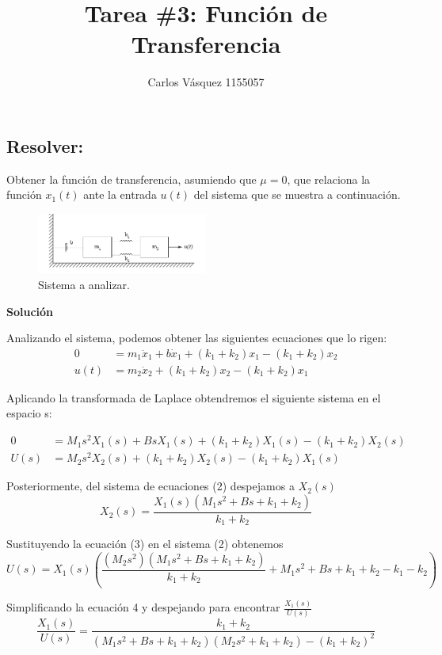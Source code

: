 \documentclass[12pt, letterpaper]{article}
\title{Tarea \#3: Función de Transferencia}
\author{Carlos Vásquez 1155057}
\begin{document}
\maketitle
\subsection*{Resolver:}
Obtener la función de transferencia, asumiendo que $\mu = 0$, que relaciona la función $x_1(t)$ ante la entrada $u(t)$ del sistema que se muestra a continuación.
\begin{figure}[H]
	\centering
	\includegraphics[width=0.5\textwidth]{sys.png}
	\caption{Sistema a analizar.}
\end{figure}
\textbf{Solución}

Analizando el sistema, podemos obtener las siguientes ecuaciones que lo rigen:
\begin{equation}
	\begin{split}
		0 &= m_1 \ddot x_1 + b\dot x_1 + (k_1 + k_2)x_1 - (k_1 + k_2)x_2 \\
		u(t) &= m_2 \ddot x_2 + (k_1 + k_2)x_2 - (k_1 + k_2)x_1
	\end{split}
\end{equation}

Aplicando la transformada de Laplace obtendremos el siguiente sistema en el espacio s:

\begin{equation}
	\begin{split}
		0 &= M_1 s^2 X_1(s) + Bs X_1(s) + (k_1 + k_2)X_1(s) - (k_1 + k_2)X_2(s) \\
		U(s) &= M_2 s^2 X_2(s) + (k_1 + k_2)X_2(s) - (k_1 + k_2)X_1(s)
	\end{split}
\end{equation}

Posteriormente, del sistema de ecuaciones (2) despejamos a $X_2(s)$
\begin{equation}
	X_2(s) = \frac{X_1(s)(M_1 s^2 + Bs + k_1 + k_2)}{k_1 + k_2}
\end{equation}

Sustituyendo la ecuación (3) en el sistema (2) obtenemos
\begin{equation}
	U(s) = X_1(s) \left( \frac{(M_2s^2)(M_1s^2 + Bs + k_1 + k_2)}{k_1 + k_2} + M_1s^2 + Bs + k_1 + k_2 - k_1 - k_2 \right)
\end{equation}

Simplificando la ecuación 4 y despejando para encontrar $\frac{X_1(s)}{U(s)}$
\begin{equation}
	\boxed{\frac{X_1(s)}{U(s)} = \frac{k_1 + k_2}{(M_1s^2 +Bs + k_1 + k_2)(M_2s^2 + k_1 + k_2) - (k_1 + k_2)^2}}
\end{equation}
\renewcommand\refname{Referencias}
\printbibliography
\end{document}
